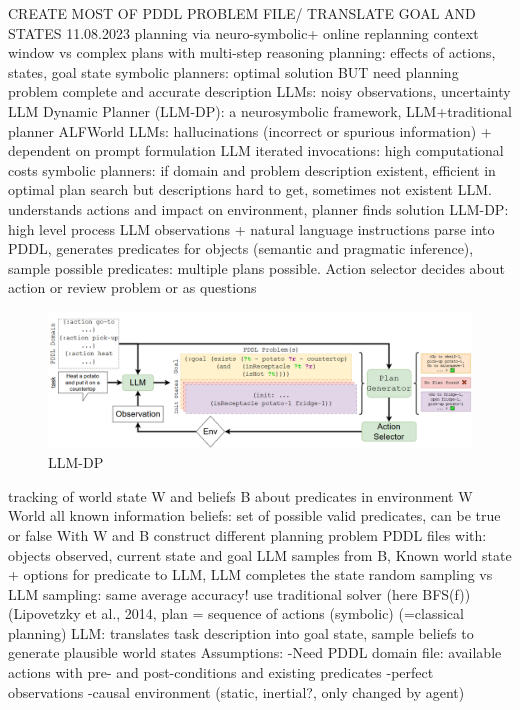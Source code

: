 \documentclass{article}
\begin{document}
CREATE MOST OF PDDL PROBLEM FILE/ TRANSLATE GOAL AND STATES
\cite{dagan_dynamic_2023} 11.08.2023 planning via neuro-symbolic+ online replanning
context window vs complex plans with multi-step reasoning
planning: effects of actions, states, goal state
symbolic planners: optimal solution BUT need planning problem complete and accurate description
LLMs: noisy observations, uncertainty
LLM Dynamic Planner (LLM-DP): a neurosymbolic framework, LLM+traditional planner
ALFWorld
LLMs: hallucinations (incorrect or spurious information) + dependent on prompt formulation
LLM iterated invocations: high computational costs
symbolic planners: if domain and problem description existent, efficient in optimal plan search
but descriptions hard to get, sometimes not existent
LLM. understands actions and impact on environment, planner finds solution
LLM-DP: high level process
LLM observations + natural language instructions parse into PDDL, generates predicates for objects (semantic and pragmatic inference), sample possible predicates: multiple plans possible. Action selector decides about action or review problem or as questions
\begin{figure}[h]
	\centering
	\includegraphics[width=0.9\linewidth]{LLM-DP}
	\caption{LLM-DP \cite{dagan_dynamic_2023} }
	\label{fig:llm-dp}
\end{figure}
tracking of world state W and beliefs B about predicates in environment
W World all known information
beliefs: set of possible valid predicates, can be true or false
With W and B construct different planning problem PDDL files with: objects observed, current state and goal
LLM samples from B, Known world state + options for predicate to LLM, LLM completes the state
random sampling vs LLM sampling: same average accuracy!
use traditional solver (here BFS(f))(Lipovetzky et al., 2014, plan = sequence of actions (symbolic) (=classical planning)
LLM: translates task description into goal state, sample beliefs to generate plausible world states
Assumptions: 
-Need PDDL domain file: available actions with pre- and post-conditions and existing predicates
-perfect observations
-causal environment (static, inertial?, only changed by agent)
\end{document}

